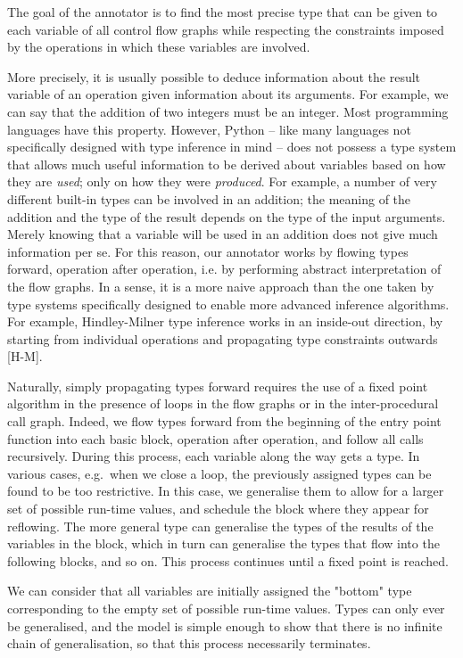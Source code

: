 \documentclass{acm_proc_article-sp}
\begin{document}
The goal of the annotator is to find the most precise type that can be
given to each variable of all control flow graphs while respecting the
constraints imposed by the operations in which these variables are
involved.

More precisely, it is usually possible to deduce information about the
result variable of an operation given information about its arguments.
For example, we can say that the addition of two integers must be an
integer.  Most programming languages have this property.  However,
Python -- like many languages not specifically designed with type
inference in mind -- does not possess a type system that allows much
useful information to be derived about variables based on how they are
\textit{used}; only on how they were \textit{produced}.  For example, a number of very
different built-in types can be involved in an addition; the meaning of
the addition and the type of the result depends on the type of the input
arguments.  Merely knowing that a variable will be used in an addition
does not give much information per se.  For this reason, our annotator
works by flowing types forward, operation after operation, i.e. by
performing abstract interpretation of the flow graphs.  In a sense, it
is a more naive approach than the one taken by type systems specifically
designed to enable more advanced inference algorithms.  For example,
Hindley-Milner type inference works in an inside-out direction, by
starting from individual operations and propagating type constraints
outwards [H-M].

Naturally, simply propagating types forward requires the use of a fixed
point algorithm in the presence of loops in the flow graphs or in the
inter-procedural call graph.  Indeed, we flow types forward from the
beginning of the entry point function into each basic block, operation
after operation, and follow all calls recursively.  During this process,
each variable along the way gets a type.  In various cases, e.g.\ when we
close a loop, the previously assigned types can be found to be too
restrictive.  In this case, we generalise them to allow for a larger set
of possible run-time values, and schedule the block where they appear
for reflowing.  The more general type can generalise the types of the
results of the variables in the block, which in turn can generalise the
types that flow into the following blocks, and so on.  This process
continues until a fixed point is reached.

We can consider that all variables are initially assigned the "bottom"
type corresponding to the empty set of possible run-time values.  Types
can only ever be generalised, and the model is simple enough to show
that there is no infinite chain of generalisation, so that this process
necessarily terminates.
\end{document}
